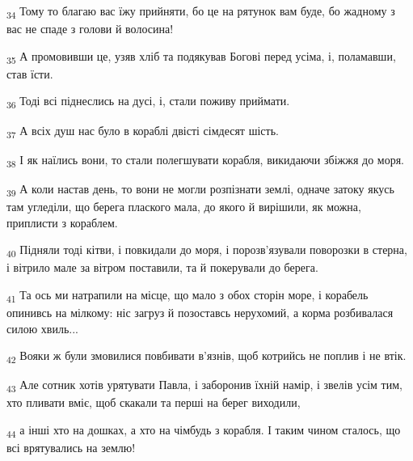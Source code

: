 \begin{tcolorbox}
\textsubscript{34} Тому то благаю вас їжу прийняти, бо це на рятунок вам буде, бо жадному з вас не спаде з голови й волосина!
\end{tcolorbox}
\begin{tcolorbox}
\textsubscript{35} А промовивши це, узяв хліб та подякував Богові перед усіма, і, поламавши, став їсти.
\end{tcolorbox}
\begin{tcolorbox}
\textsubscript{36} Тоді всі піднеслись на дусі, і, стали поживу приймати.
\end{tcolorbox}
\begin{tcolorbox}
\textsubscript{37} А всіх душ нас було в кораблі двісті сімдесят шість.
\end{tcolorbox}
\begin{tcolorbox}
\textsubscript{38} І як наїлись вони, то стали полегшувати корабля, викидаючи збіжжя до моря.
\end{tcolorbox}
\begin{tcolorbox}
\textsubscript{39} А коли настав день, то вони не могли розпізнати землі, одначе затоку якусь там угледіли, що берега плаского мала, до якого й вирішили, як можна, приплисти з кораблем.
\end{tcolorbox}
\begin{tcolorbox}
\textsubscript{40} Підняли тоді кітви, і повкидали до моря, і порозв'язували поворозки в стерна, і вітрило мале за вітром поставили, та й покерували до берега.
\end{tcolorbox}
\begin{tcolorbox}
\textsubscript{41} Та ось ми натрапили на місце, що мало з обох сторін море, і корабель опинивсь на мілкому: ніс загруз й позоставсь нерухомий, а корма розбивалася силою хвиль...
\end{tcolorbox}
\begin{tcolorbox}
\textsubscript{42} Вояки ж були змовилися повбивати в'язнів, щоб котрийсь не поплив і не втік.
\end{tcolorbox}
\begin{tcolorbox}
\textsubscript{43} Але сотник хотів урятувати Павла, і заборонив їхній намір, і звелів усім тим, хто пливати вміє, щоб скакали та перші на берег виходили,
\end{tcolorbox}
\begin{tcolorbox}
\textsubscript{44} а інші хто на дошках, а хто на чімбудь з корабля. І таким чином сталось, що всі врятувались на землю!
\end{tcolorbox}
